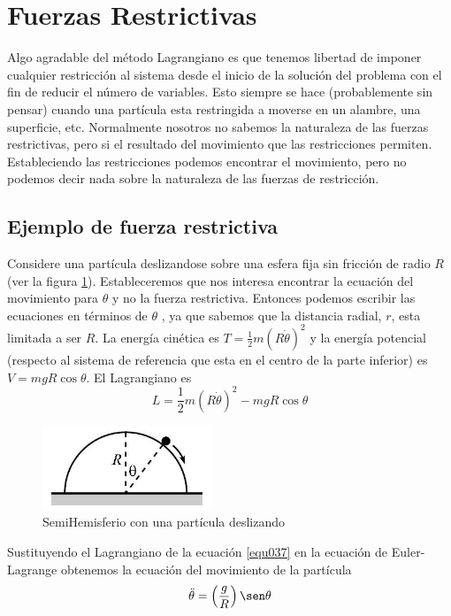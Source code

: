 \documentclass[12pt]{book}
\theoremstyle{definition}
\theoremstyle{remark}
\theoremstyle{plain}
\begin{document}
\section{Fuerzas Restrictivas}
Algo agradable del método Lagrangiano es que tenemos libertad de imponer cualquier restricción al sistema desde el inicio de la solución del problema con el fin de reducir el número de variables. Esto siempre se hace (probablemente sin pensar) cuando una partícula esta restringida a moverse en un alambre, una superficie, etc. Normalmente nosotros no sabemos la naturaleza de las fuerzas restrictivas, pero si el resultado del movimiento que las restricciones permiten. Estableciendo las restricciones podemos encontrar el movimiento, pero no podemos decir nada sobre la naturaleza de las fuerzas de restricción.
\subsection{Ejemplo de fuerza restrictiva}

Considere una partícula deslizandose sobre una esfera fija sin fricción de radio $R$ (ver la figura \ref{fig103}). Estableceremos que nos interesa encontrar la ecuación del movimiento para $\theta$ y no la fuerza restrictiva. Entonces podemos escribir las ecuaciones en términos de $\theta$ , ya que sabemos que la distancia radial, $r$, esta limitada a ser $R$. La energía cinética es $T= \frac{1}{2} m (R \dot{\theta}) ^2$ y la energía potencial (respecto al sistema de referencia que esta en el centro de la parte inferior) es $V=m g R \cos \theta$. El Lagrangiano es
\begin{equation}
\label{equ037}
L =  \frac{1}{2} m (R \dot{\theta}) ^2 -m g R \cos \theta
\end{equation}

\begin{figure}
\centering
\includegraphics[width=2in]{hemisferio.jpg}
\caption{SemiHemisferio con una partícula deslizando}
\label{fig103}
\end{figure}

Sustituyendo el Lagrangiano de la ecuación \ref{equ037} en la ecuación de Euler- Lagrange obtenemos la ecuación del movimiento de la partícula
\begin{equation}
\label{equ038}
\ddot{\theta}=\left ( \frac{g}{R} \right ) \sen \theta 
\end{equation}
\end{document}
